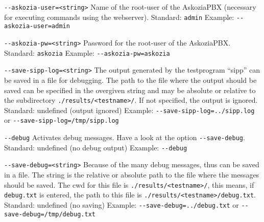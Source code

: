 \begin{description}
\item {\texttt{-{}-askozia-user=<string>}} \newline
Name of the root-user of the AskoziaPBX
(necessary for executing commands using the webserver).
\newline Standard: \texttt{admin}
\newline Example: \texttt{-{}-askozia-user=admin}

\item {\texttt{-{}-askozia-pw=<string>}} \newline
Password for the root-user of the AskoziaPBX.
\newline Standard: \texttt{askozia}
\newline Example: \texttt{-{}-askozia-pw=askozia}

\item {\texttt{-{}-save-sipp-log=<string>}} \newline
The output generated by the testprogram ``sipp'' can be saved in a file for debugging.
The path to the file where the output should be saved can be specified in the
overgiven string and may be absolute or relative to the subdirectory
\texttt{./results/<testname>/}. If not specified, the output is ignored.
\newline Standard: undefined (output ignored)
\newline Example: \texttt{-{}-save-sipp-log=../sipp.log} or \texttt{-{}-save-sipp-log=/tmp/sipp.log}

\item {\texttt{-{}-debug}} \newline
Activates debug messages. Have a look at the option \texttt{-{}-save-debug}.
\newline Standard: undefined (no debug output)
\newline Example: \texttt{-{}-debug}

\item {\texttt{-{}-save-debug=<string>}} \newline
Because of the many debug messages, thus can be saved in a file.
The string is the relative or absolute path to the file where the
messages should be saved. The cwd for this file is \texttt{./results/<testname>/},
this means, if \texttt{debug.txt} is entered, the path to this file is
\texttt{./results/<testname>/debug.txt}.
\newline Standard: undefined (no saving)
\newline Example: \texttt{-{}-save-debug=../debug.txt} or \texttt{-{}-save-debug=/tmp/debug.txt}


\end{description}
